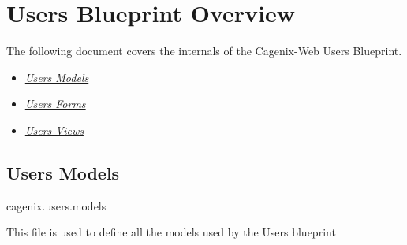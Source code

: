 \documentclass[letterpaper,10pt,english]{sphinxmanual}
\begin{document}
\chapter{Users Blueprint Overview}
\label{dev-users::doc}\label{dev-users:users-blueprint-overview}
The following document covers the internals of the Cagenix-Web Users
Blueprint.
\begin{itemize}
\item {} 
{\hyperref[dev-users:users-models-label]{\emph{Users Models}}}

\item {} 
{\hyperref[dev-users:users-forms-label]{\emph{Users Forms}}}

\item {} 
{\hyperref[dev-users:users-views-label]{\emph{Users Views}}}

\end{itemize}


\section{Users Models}
\label{dev-users:users-models-label}\label{dev-users:module-cagenix.users.models}\label{dev-users:users-models}
cagenix.users.models

This file is used to define all the models used by the Users blueprint
\end{document}

